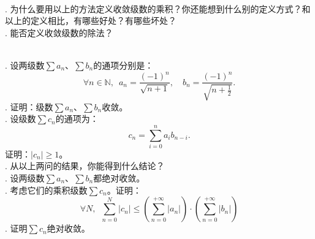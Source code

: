 \documentclass[12pt,UTF8]{ctexbook}
\begin{document}


\begin{sk}
    \mbox{} \\
    . 为什么要用以上的方法定义收敛级数的乘积？你还能想到什么别的定义方式？和以上的定义相比，有哪些好处？有哪些坏处？\\
    . 能否定义收敛级数的除法？
\end{sk}

\begin{xt}
    \mbox{} \\
    . 设两级数$\sum a_n$、$\sum b_n$的通项分别是：
    $$ \forall n\in\mathbb{N}, \,\,\, a_n = \frac{(-1)^n}{\sqrt{n+1}}, \quad b_n = \frac{(-1)^n}{\sqrt{n+\frac{1}{2}}}. $$
    . 证明：级数$\sum a_n$、$\sum b_n$收敛。\\
    . 设级数$\sum c_n$的通项为：
    $$ c_n = \sum_{i=0}^n a_i b_{n-i} . $$
    \indent 证明：$|c_n| \geqslant 1$。\\
    . 从以上两问的结果，你能得到什么结论？\\
    . 设两级数$\sum a_n$、$\sum b_n$都绝对收敛。\\
    . 考虑它们的乘积级数$\sum c_n$。证明：
    $$ \forall N, \,\,\, \sum_{n=0}^{N} |c_n| \leqslant \left(\sum_{n=0}^{+\infty} |a_n| \right) \cdot \left(\sum_{n=0}^{+\infty} |b_n| \right)$$
    . 证明$\sum c_n$绝对收敛。
\end{xt}
\end{document}
